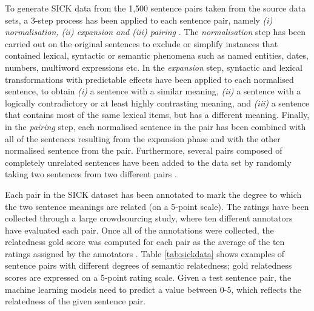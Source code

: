 \begin{enumerate}
  To generate SICK data from the 1,500 sentence pairs taken from the source data sets, a 3-step process has been applied to each sentence pair, namely \textit{(i) normalisation, (ii) expansion and (iii) pairing} \autocite{marelli-etal-2014-semeval}. The \textit{normalisation} step has been carried out on the original sentences to exclude or simplify instances that contained lexical, syntactic or semantic phenomena such as named entities, dates, numbers, multiword expressions etc. In the \textit{expansion} step, syntactic and lexical transformations with predictable effects have been applied to each normalised sentence, to obtain \textit{(i)} a sentence with a similar meaning, \textit{(ii)} a sentence with a logically contradictory or at least highly contrasting meaning, and \textit{(iii)} a sentence that contains most of the same lexical items, but has a different meaning. Finally, in the \textit{pairing} step, each normalised sentence in the pair has been combined with all of the sentences resulting from the expansion phase and with the other normalised sentence from the pair. Furthermore, several pairs composed of completely unrelated sentences have been added to the data set by randomly taking two sentences from two different pairs \autocite{marelli-etal-2014-semeval}. 
  
  Each pair in the SICK dataset has been annotated to mark the degree to which the two sentence meanings are related (on a 5-point scale). The ratings have been collected through a large crowdsourcing study, where ten different annotators have evaluated each pair. Once all of the annotations were collected, the relatedness gold score was computed for each pair as the average of the ten ratings assigned by the annotators \autocite{marelli-etal-2014-semeval}. Table \ref{tab:sickdata} shows examples of sentence pairs with different degrees of semantic relatedness; gold relatedness scores are expressed on a 5-point rating scale. Given a test sentence pair, the machine learning models need to predict a value between 0-5, which reflects the relatedness of the given sentence pair. 
  

\end{enumerate}
